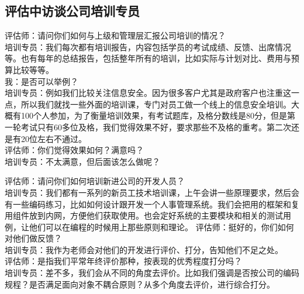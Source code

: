 \hypertarget{ux603bux7ed3ux8bbfux8c08ux7684ux95eeux9898ux53d1ux73b0}{%
\subsection{评估中访谈公司培训专员}\label{ux603bux7ed3ux8bbfux8c08ux7684ux95eeux9898ux53d1ux73b0}}

评估师：请问你们如何与上级和管理层汇报公司培训的情况？\\
培训专员：我们每次都有培训报告，内容包括学员的考试成绩、反馈、出席情况等。也有每年的总结报告，包括整年所有的培训，比如实际与计划对比、费用与预算比较等等。\\
我：是否可以举例？\\

培训专员：例如我们比较关注信息安全。因为很多客户尤其是政府客户也注重这一点，所以我们就找一些外面的培训课，专门对员工做一个线上的信息安全培训。大概有100个人参加，为了衡量培训效果，有考试题库，及格分数线是80分，但是第一轮考试只有60多位及格，我们觉得效果不好，要求那些不及格的重考。第二次还是有20位左右不通过。\\

评估师：你们觉得效果如何？满意吗？\\

培训专员：不太满意，但后面该怎么做呢？

\begin{description}
\item[]
\end{description}

评估师：请问你们如何培训新进公司的开发人员？\\
培训专员：我们都有一系列的新员工技术培训课，上午会讲一些原理要求，然后会有一些编码练习，比如如何设计跟开发一个人事管理系统。我们会把用的框架和复用组件放到内网，方便他们获取使用。也会定好系统的主要模块和相关的测试用例，让他们可以在编程的时候用上那些原则和理论。
评估师：挺好的，你们如何对他们做反馈？\\
培训专员：我作为老师会对他们的开发进行评价、打分，告知他们不足之处。\\
评估师：是指我们平常年终评价那种，按表现的优秀程度打分吗？\\
培训专员：差不多，我们会从不同的角度去评价。比如我们强调是否按公司的编码规程？是否满足面向对象不耦合原则？从多个角度去评价，进行综合打分。\\

